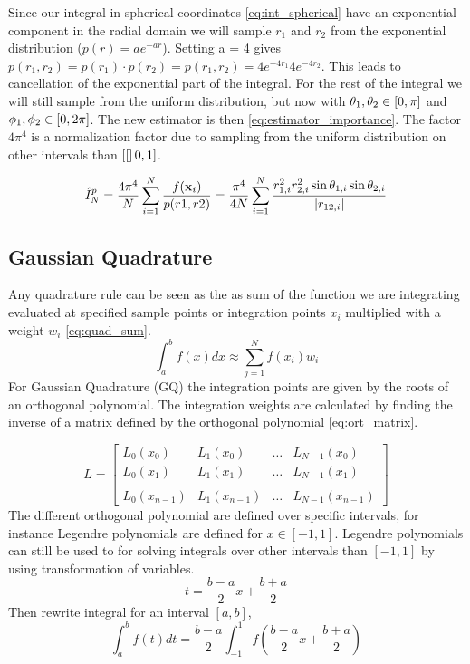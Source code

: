 Since our integral in spherical coordinates \cref{eq:int_spherical} have an exponential
component in the radial domain we will sample $r_1$ and $r_2$ from the exponential distribution
($p(r) = ae^{-ar}$). Setting a = 4 gives
$p(r_1, r_2) = p(r_1) \cdot p(r_2) = p(r_1,r_2) = 4e^{-4r_1} 4e^{-4r_2}$.
This leads to cancellation of the exponential part of the integral. For the
rest of the integral we will still sample from the uniform distribution,
but now with $\theta_1, \theta_2 \in \left[0, \pi\right]$ and
$\phi_1, \phi_2 \in \left[0, 2\pi\right]$.
The new estimator is then
\cref{eq:estimator_importance}. The factor $4\pi^4$ is a normalization factor due
to sampling from the uniform distribution on other intervals than $\left[[\right]0,1]$.

\begin{equation}
  \label{eq:estimator_importance}
  \hat{I}_N^p
  = \frac{4\pi^4}{N} \sum_{i=1}^{N} \frac{f(\mathbf{x}_i)}{p(r1,r2)}
  = \frac{\pi^4}{4N} \sum_{i=1}^{N}
  \frac{r_{1,i}^2 r_{2,i}^2 \sin{\theta_{1,i}} \sin{\theta_{2,i}}}{\abs{r_{12,i}}}
\end{equation}


\subsection{Gaussian Quadrature}
Any quadrature rule can be seen as the as sum of the function we are
integrating evaluated at specified sample points or integration points $x_i$
multiplied with a weight $w_i$ \cref{eq:quad_sum}.
\begin{equation}\label{eq:quad_sum}
  \int_{a}^{b} f(x)dx \approx \sum_{j=1}^{N} f(x_i) w_i
\end{equation}
For Gaussian Quadrature (GQ) the
integration points are given by the roots of an orthogonal polynomial. The
integration weights are calculated by finding the inverse of a matrix defined by
the orthogonal polynomial \cref{eq:ort_matrix}.

\begin{equation}\label{eq:ort_matrix}
  L = \begin{bmatrix}
    L_0(x_0) & L_1(x_0) & \dots & L_{N-1}(x_{0}) \\
    L_0(x_1) & L_1(x_1) & \dots & L_{N-1}(x_{1}) \\
    \\
    L_0(x_{n-1}) & L_1(x_{n-1}) & \dots & L_{N-1}(x_{n-1})
  \end{bmatrix}
\end{equation}
The different orthogonal polynomial are defined over specific intervals, for
instance Legendre polynomials are defined for $x \in [-1, 1]$. Legendre
polynomials can still be used to for solving integrals over other intervals
than $[-1,1]$ by using transformation of variables.
\begin{equation}
  t = \frac{b-a}{2}x + \frac{b+a}{2}
\end{equation}
Then rewrite integral for an interval $[a,b]$,
\begin{equation}
  \int_a^b f(t)dt = \frac{b-a}{2}\int_{-1}^{1} f\left(\frac{b-a}{2}x + \frac{b+a}{2}\right)
\end{equation}

